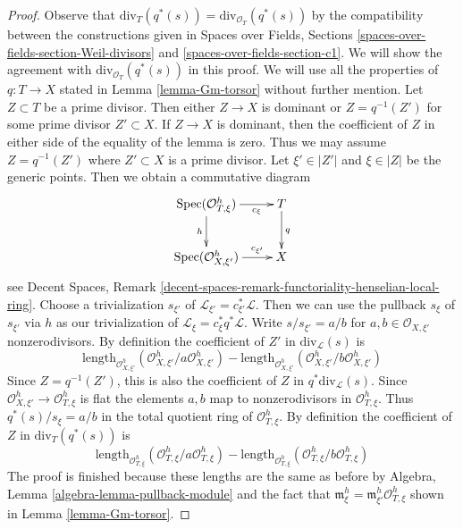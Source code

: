 \documentclass[10pt,a4paper]{amsart}
\theoremstyle{plain}
\theoremstyle{definition}
\theoremstyle{remark}
\numberwithin{equation}{subsection}
\def\Spec{\mathop{\mathrm{Spec}}}
\begin{document}
\begin{proof}
Observe that $\text{div}_T(q^*(s)) = \text{div}_{\mathcal{O}_T}(q^*(s))$
by the compatibility between the constructions given in
Spaces over Fields, Sections
\ref{spaces-over-fields-section-Weil-divisors} and
\ref{spaces-over-fields-section-c1}.
We will show the agreement with $\text{div}_{\mathcal{O}_T}(q^*(s))$
in this proof.
We will use all the properties of $q : T \to X$ stated in
Lemma \ref{lemma-Gm-torsor} without further mention.
Let $Z \subset T$ be a prime divisor.
Then either $Z \to X$ is dominant or $Z = q^{-1}(Z')$ for some
prime divisor $Z' \subset X$.
If $Z \to X$ is dominant, then the coefficient of $Z$ in
either side of the equality of the lemma is zero.
Thus we may assume $Z = q^{-1}(Z')$ where $Z' \subset X$
is a prime divisor.
Let $\xi' \in |Z'|$ and $\xi \in |Z|$ be the generic points.
Then we obtain a commutative diagram
$$
\xymatrix{
\Spec(\mathcal{O}_{T, \xi}^h) \ar[r]_-{c_\xi} \ar[d]_h & T \ar[d]^q \\
\Spec(\mathcal{O}_{X, \xi'}^h) \ar[r]^-{c_{\xi'}} & X
}
$$
see Decent Spaces, Remark
\ref{decent-spaces-remark-functoriality-henselian-local-ring}.
Choose a trivialization $s_{\xi'}$ of
$\mathcal{L}_{\xi'} = c_{\xi'}^*\mathcal{L}$.
Then we can use the pullback $s_\xi$ of $s_{\xi'}$ via $h$
as our trivialization of $\mathcal{L}_\xi = c_\xi^* q^*\mathcal{L}$.
Write $s/s_{\xi'} = a/b$ for $a, b \in \mathcal{O}_{X, \xi'}$ nonzerodivisors.
By definition the coefficient of $Z'$ in
$\text{div}_\mathcal{L}(s)$ is
$$
\text{length}_{\mathcal{O}_{X, \xi'}^h}(
\mathcal{O}_{X, \xi'}^h/a \mathcal{O}_{X, \xi'}^h)
-
\text{length}_{\mathcal{O}_{X, \xi'}^h}(
\mathcal{O}_{X, \xi'}^h/b \mathcal{O}_{X, \xi'}^h)
$$
Since $Z = q^{-1}(Z')$, this is also the coefficient of $Z$ in
$q^*\text{div}_\mathcal{L}(s)$. Since
$\mathcal{O}_{X, \xi'}^h \to \mathcal{O}_{T, \xi}^h$
is flat the elements $a, b$ map to nonzerodivisors in
$\mathcal{O}_{T, \xi}^h$. Thus $q^*(s)/s_\xi = a/b$ in the total quotient
ring of $\mathcal{O}_{T, \xi}^h$. By definition the coefficient of
$Z$ in $\text{div}_T(q^*(s))$ is
$$
\text{length}_{\mathcal{O}_{T, \xi}^h}(
\mathcal{O}_{T, \xi}^h/a \mathcal{O}_{T, \xi}^h)
-
\text{length}_{\mathcal{O}_{T, \xi}^h}(
\mathcal{O}_{T, \xi}^h/b \mathcal{O}_{T, \xi}^h)
$$
The proof is finished because these lengths are the same as before
by Algebra, Lemma \ref{algebra-lemma-pullback-module} and the
fact that $\mathfrak m_\xi^h = \mathfrak m_{\xi'}^h\mathcal{O}_{T, \xi}^h$
shown in Lemma \ref{lemma-Gm-torsor}.
\end{proof}
\end{document}

